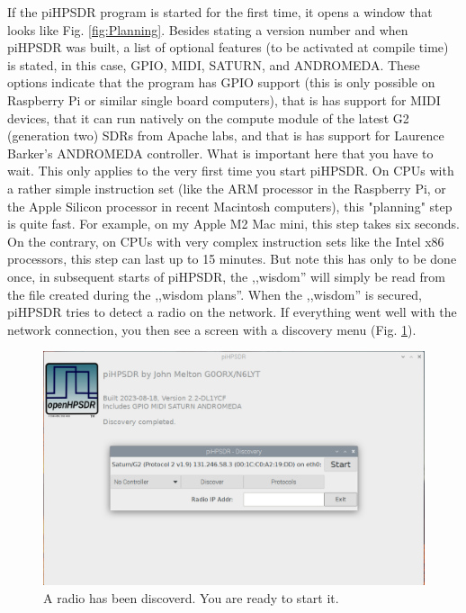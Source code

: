 \documentclass[12pt]{book}
\begin{document}
If the piHPSDR program is started for the first time, it opens a window that looks like Fig. \ref{fig:Planning}. 
Besides stating a version number and when piHPSDR was built, a list of optional features (to be activated
at compile time) is stated, in this case, GPIO, MIDI, SATURN, and ANDROMEDA. These options indicate
that the program has GPIO support (this is only possible on Raspberry Pi or similar single board computers),
that is has support for MIDI devices, that it can run natively on the compute module of the latest
G2 (generation two) SDRs from Apache labs, and that is has support for Laurence Barker's ANDROMEDA controller.
What is important here that you have to wait. This only applies to the very first time you start piHPSDR.
On CPUs with a rather simple instruction set (like the ARM processor in the Raspberry Pi, or the Apple
Silicon processor in recent Macintosh computers), this "planning" step is quite fast. For example, on my
Apple M2 Mac mini, this step takes six seconds. On the contrary, on CPUs with very
complex instruction sets like the Intel x86 processors, this step can last up to 15 minutes. But note
this has only to be done once, in subsequent starts of piHPSDR, the ,,wisdom'' will simply be read from
the file created during the ,,wisdom plans''.
When the ,,wisdom'' is secured, piHPSDR tries to detect a radio on the network. If everything went well with
the network connection, you then see a screen with a discovery menu (Fig. \ref{fig:Start}).

\begin{figure}
\center
\includegraphics[width=12cm]{Start.png}
\caption{A radio has been discoverd. You are ready  to start it.}
\label{fig:Start}
\end{figure}
\end{document}

